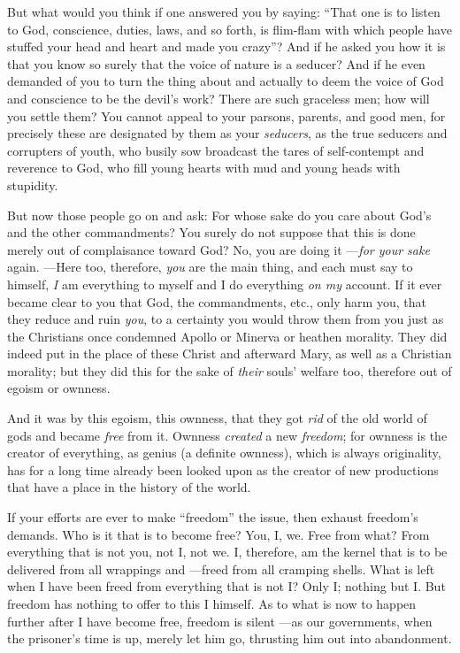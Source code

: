 But what would you think if one answered you by saying: ``That one is to 
listen to God, conscience, duties, laws, and so forth, is flim-flam with which 
people have stuffed your head and heart and made you crazy''? And if he asked 
you how it is that you know so surely that the voice of nature is a seducer? 
And if he even demanded of you to turn the thing about and actually to deem 
the voice of God and conscience to be the devil's work? There are such 
graceless men; how will you settle them? You cannot appeal to your parsons, 
parents, and good men, for precisely these are designated by them as your 
\textit{seducers}, as the true seducers and corrupters of youth, who busily 
sow broadcast the tares of self-contempt and reverence to God, who fill young 
hearts with mud and young heads with stupidity.

But now those people go on and ask: For whose sake do you care about God's and 
the other commandments? You surely do not suppose that this is done merely out 
of complaisance toward God? No, you are doing it ---\textit{for your sake} 
again. ---Here too, therefore, \textit{you} are the main thing, and each must 
say to himself, \textit{I} am everything to myself and I do everything 
\textit{on my} account. If it ever became clear to you that God, the 
commandments, etc., only harm you, that they reduce and ruin \textit{you}, to 
a certainty you would throw them from you just as the Christians once 
condemned Apollo or Minerva or heathen morality. They did indeed put in the 
place of these Christ and afterward Mary, as well as a Christian morality; but 
they did this for the sake of \textit{their} souls' welfare too, therefore out 
of egoism or ownness.

And it was by this egoism, this ownness, that they got \textit{rid} of the old 
world of gods and became \textit{free} from it. Ownness \textit{created} a new 
\textit{freedom}; for ownness is the creator of everything, as genius (a 
definite ownness), which is always originality, has for a long time already 
been looked upon as the creator of new productions that have a place in the 
history of the world.

If your efforts are ever to make ``freedom'' the issue, then exhaust 
freedom's demands. Who is it that is to become free? You, I, we. Free from 
what? From everything that is not you, not I, not we. I, therefore, am the 
kernel that is to be delivered from all wrappings and ---freed from all 
cramping shells. What is left when I have been freed from everything that is 
not I? Only I; nothing but I. But freedom has nothing to offer to this I 
himself. As to what is now to happen further after I have become free, freedom 
is silent ---as our governments, when the prisoner's time is up, merely let 
him go, thrusting him out into abandonment.

